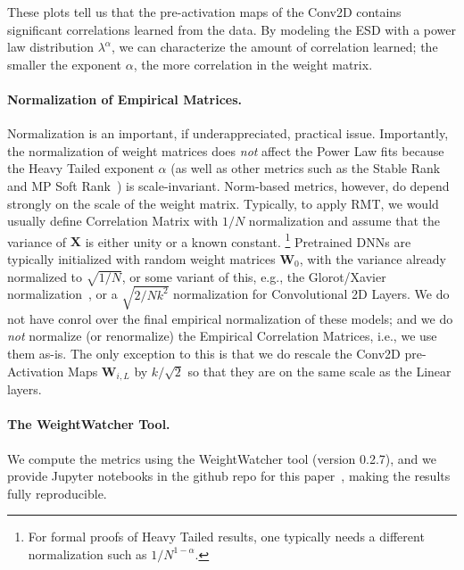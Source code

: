 These plots tell us that the pre-activation maps of the Conv2D contains significant correlations learned from the data.  
By modeling the ESD with a power law distribution $\lambda^{\alpha}$, we can characterize the amount of correlation learned;
the smaller the exponent $\alpha$, the more correlation in the weight matrix. 

\paragraph{Normalization of Empirical Matrices.}  
Normalization is an important, if underappreciated, practical issue.
Importantly, the normalization of weight matrices does \emph{not} affect the Power Law fits because the Heavy Tailed exponent $\alpha$ (as well as other metrics such as the Stable Rank and MP Soft Rank~\cite{MM18_TR,MM19_HTSR_ICML}) is scale-invariant.
Norm-based metrics, however, do depend strongly on the scale of the weight matrix.
Typically, to apply RMT, we would usually define Correlation Matrix with $1/N$ normalization and assume that the variance of $\mathbf{X}$ is either unity or a known constant.%
\footnote{For formal proofs of Heavy Tailed results, one typically needs a different normalization such as $1/N^{1-\alpha}$.}
Pretrained DNNs are typically initialized with random weight matrices $\mathbf{W}_{0}$, with the variance already normalized to $\sqrt{1/N}$, or some variant of this, e.g., the Glorot/Xavier normalization~\cite{GloRot}, or a $\sqrt{2/Nk^2}$ normalization for Convolutional 2D Layers.
We do not have conrol over the final empirical normalization of these models; and we do \emph{not} normalize (or renormalize) the Empirical Correlation Matrices, i.e., we use them as-is.
The only exception to this is that we do rescale the Conv2D pre-Activation Maps $\mathbf{W}_{i,L}$ by $k/\sqrt{2}$ so that they are on the same scale as the Linear layers.



\paragraph{The WeightWatcher Tool.}

We compute the metrics using the WeightWatcher tool (version 0.2.7), and we provide Jupyter notebooks in the github repo for this paper~\cite{repo}, making the results fully reproducible.



